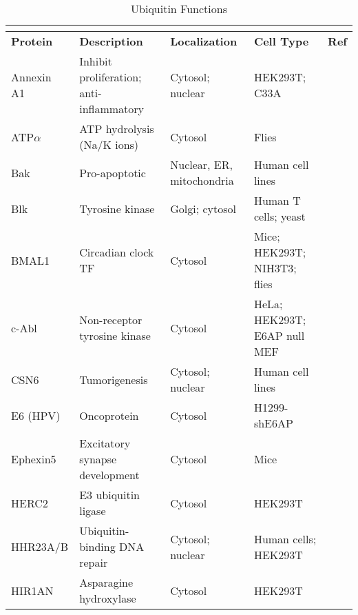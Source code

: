 \begin{longtabu} to \textwidth {X[1,l]X[1.2,l]X[1,l]X[1,l]X[0.4,c]}
  \caption{Ubiquitin Functions}\\
  \label{table:a-1}\\
  \toprule
  \textbf{Protein} & \textbf{Description} & \textbf{Localization} & \textbf{Cell Type} & \textbf{Ref}\\
  \midrule
  \endhead
  Annexin A1  & Inhibit proliferation; anti-inflammatory & Cytosol; nuclear          & HEK293T; C33A                & \cite{Shimoji2009}\\
  ATP$\alpha$ & ATP hydrolysis (Na/K ions)               & Cytosol                   & Flies                        & \cite{Jensen2013}\\
  Bak         & Pro-apoptotic                            & Nuclear, ER, mitochondria & Human cell lines             & \cite{Thomas1998}\\
  Blk         & Tyrosine kinase                          & Golgi; cytosol            & Human T cells; yeast         & \cite{Oda1999}\\
  BMAL1       & Circadian clock TF                       & Cytosol                   & Mice; HEK293T; NIH3T3; flies & \cite{Gossan2014}\\
  c-Abl       & Non-receptor tyrosine kinase             & Cytosol                   & HeLa; HEK293T; E6AP null MEF & \cite{Chan2013}\\
  CSN6        & Tumorigenesis                            & Cytosol; nuclear          & Human cell lines             & \cite{Gao2015}\\
  E6 (HPV)    & Oncoprotein                              & Cytosol                   & H1299-shE6AP                 & \cite{Mortensen2015}\\
  Ephexin5    & Excitatory synapse development           & Cytosol                   & Mice                         & \cite{Margolis2010}\\
  HERC2       & E3 ubiquitin ligase                      & Cytosol                   & HEK293T                      & \cite{Galligan2015,Kuhnle2011}\\
  HHR23A/B    & Ubiquitin-binding DNA repair             & Cytosol; nuclear          & Human cells; HEK293T         & \cite{Kuhnle2011,Kumar1999}\\
  HIR1AN      & Asparagine hydroxylase                   & Cytosol                   & HEK293T                      & \cite{Martinez-Noel2012}\\

\end{longtabu}
